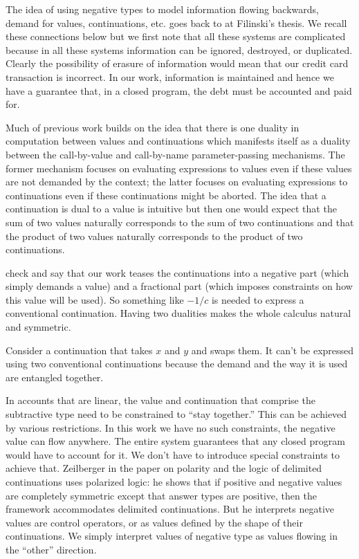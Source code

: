 \documentclass[preprint]{sigplanconf}
\begin{document}
The idea of using negative types to model information flowing backwards,
demand for values, continuations, etc. goes back to at Filinski's thesis. We
recall these connections below but we first note that all these systems are
complicated because in all these systems information can be ignored,
destroyed, or duplicated. Clearly the possibility of erasure of information
would mean that our credit card transaction is incorrect. In our work,
information is maintained and hence we have a guarantee that, in a closed
program, the debt must be accounted and paid for.

Much of previous work builds on the idea that there is one duality in
computation between values and continuations which manifests itself as a
duality between the call-by-value and call-by-name parameter-passing
mechanisms. The former mechanism focuses on evaluating expressions to values
even if these values are not demanded by the context; the latter focuses on
evaluating expressions to continuations even if these continuations might be
aborted. The idea that a continuation is dual to a value is intuitive but
then one would expect that the sum of two values naturally corresponds to the
sum of two continuations and that the product of two values naturally
corresponds to the product of two continuations.

check and say that our work teases the continuations into a negative part
(which simply demands a value) and a fractional part (which imposes
constraints on how this value will be used). So something like $-1/c$ is
needed to express a conventional continuation. Having two dualities makes the
whole calculus natural and symmetric.

Consider a continuation that takes $x$ and $y$ and swaps them. It can't be
expressed using two conventional continuations because the demand and the way
it is used are entangled together.

In accounts that are linear, the value and continuation that comprise the
subtractive type need to be constrained to ``stay together.'' This can be
achieved by various restrictions. In this work we have no such constraints,
the negative value can flow anywhere. The entire system guarantees that any
closed program would have to account for it. We don't have to introduce
special constraints to achieve that. Zeilberger in the paper on polarity and
the logic of delimited continuations uses polarized logic: he shows that if
positive and negative values are completely symmetric except that answer
types are positive, then the framework accommodates delimited
continuations. But he interprets negative values are control operators, or as
values defined by the shape of their continuations. We simply interpret
values of negative type as values flowing in the ``other'' direction.
\end{document}
